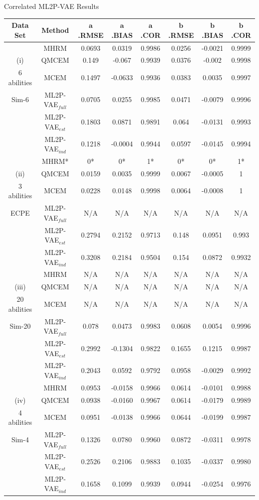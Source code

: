 \documentclass{beamer}
\newcommand{\vect}[1]{\boldsymbol{#1}}
\theoremstyle{definition}
\begin{document}
\begin{frame}{Correlated ML2P-VAE Results}
  \tiny
\begin{tabular}{c|c|ccc|ccc}
  \hline
    Data Set & Method & $\vect a$.RMSE & $\vect a$.BIAS & $\vect a$.COR & $\vect b$.RMSE & $\vect b$.BIAS & $\vect b$.COR \\
    \hline
& MHRM & 0.0693 & 0.0319  & 0.9986   & 0.0256 & -0.0021 & 0.9999 \\
(i)& QMCEM & 0.149 & -0.067 & 0.9939 & 0.0376 & -0.002 & 0.9998\\
6 abilities& MCEM & 0.1497 & -0.0633 &  0.9936 &  0.0383 & 0.0035 & 0.9997\\
Sim-6& ML2P-VAE$_{full}$ & 0.0705 &  0.0255  & 0.9985   & 0.0471 & -0.0079 & 0.9996\\
& ML2P-VAE$_{est}$ & 0.1803 & 0.0871  & 0.9891 &  0.064 & -0.0131 & 0.9993 \\
& ML2P-VAE$_{ind}$ & 0.1218 & -0.0004 & 0.9944   & 0.0597 & -0.0145 & 0.9994\\ 
\hline 
& MHRM* & 0* & 0*&  1* &  0* &  0* &  1*\\
(ii)& QMCEM & 0.0159  & 0.0035 & 0.9999 & 0.0067  & -0.0005 & 1  \\
3 abilities & MCEM & 0.0228 & 0.0148 & 0.9998 & 0.0064  & -0.0008 & 1\\ 
ECPE & ML2P-VAE$_{full}$ & N/A & N/A & N/A & N/A & N/A & N/A\\
& ML2P-VAE$_{est}$ & 0.2794 & 0.2152 & 0.9713 & 0.148 & 0.0951  & 0.993\\
& ML2P-VAE$_{ind}$ & 0.3208 & 0.2184 & 0.9504 & 0.154 & 0.0872  & 0.9932\\ 
\hline
& MHRM & N/A & N/A & N/A & N/A & N/A & N/A\\
(iii)& QMCEM & N/A & N/A & N/A & N/A & N/A & N/A\\
20 abilities & MCEM & N/A & N/A & N/A & N/A & N/A & N/A\\
Sim-20 & ML2P-VAE$_{full}$ & 0.078 &  0.0473  & 0.9983  & 0.0608 &  0.0054  & 0.9996\\ 
& ML2P-VAE$_{est}$ & 0.2992  & -0.1304  & 0.9822  & 0.1655 &  0.1215  & 0.9987 \\
& ML2P-VAE$_{ind}$ & 0.2043 &   0.0592  & 0.9792  & 0.0958   & -0.0029  & 0.9992\\ 
\hline 
& MHRM & 0.0953 & -0.0158	&	0.9966 & 0.0614 & -0.0101 &	0.9988\\
(iv)& QMCEM & 0.0938 & -0.0160	&	0.9967 & 0.0614 & -0.0179 &	0.9989\\
4 abilities & MCEM & 0.0951 & -0.0138	&	0.9966 & 0.0644 & -0.0199 &	0.9987\\
Sim-4 & ML2P-VAE$_{full}$ & 0.1326 & 0.0780		&	0.9960 & 0.0872 & -0.0311 &	0.9978\\
& ML2P-VAE$_{est}$ & 0.2526 & 0.2106		&	0.9883 & 0.1035 & -0.0337 &	0.9980\\
& ML2P-VAE$_{ind}$ & 0.1658 & 0.1099		&	0.9939 & 0.0944 & -0.0254 &	0.9976\\

\hline
\end{tabular}
\end{frame}
\end{document}
